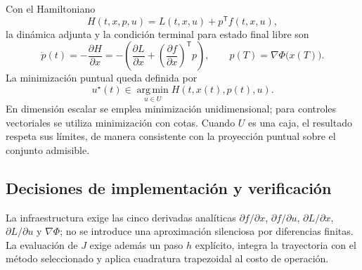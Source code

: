 \documentclass[11pt,a4paper]{article}
\begin{document}
Con el Hamiltoniano
\begin{equation}
    H(t,x,p,u)=L(t,x,u)+p^{\mathsf T}f(t,x,u),
\end{equation}
la dinámica adjunta y la condición terminal para estado final libre son
\begin{equation}
    \dot{p}(t)=-\frac{\partial H}{\partial x}
    =-\left(\frac{\partial L}{\partial x}
    +\left(\frac{\partial f}{\partial x}\right)^{\mathsf T}p\right),
    \qquad
    p(T)=\nabla\Phi\bigl(x(T)\bigr).
\end{equation}
La minimización puntual queda definida por
\begin{equation}
    u^{\star}(t)\in\operatorname*{arg\,min}_{u\in U}H(t,x(t),p(t),u).
\end{equation}
En dimensión escalar se emplea minimización unidimensional; para controles vectoriales se utiliza minimización con cotas. Cuando $U$ es una caja, el resultado respeta sus límites, de manera consistente con la proyección puntual sobre el conjunto admisible.

\subsection{Decisiones de implementación y verificación}

La infraestructura exige las cinco derivadas analíticas $\partial f/\partial x$, $\partial f/\partial u$, $\partial L/\partial x$, $\partial L/\partial u$ y $\nabla\Phi$; no se introduce una aproximación silenciosa por diferencias finitas. La evaluación de $J$ exige además un paso $h$ explícito, integra la trayectoria con el método seleccionado y aplica cuadratura trapezoidal al costo de operación.
\end{document}
